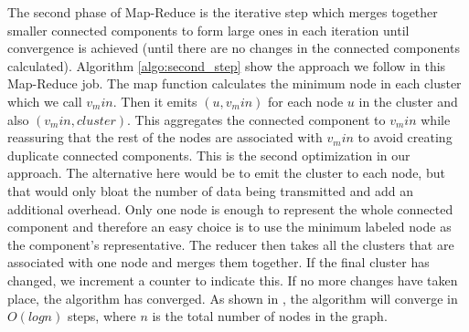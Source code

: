 The second phase of Map-Reduce is the iterative step which merges together smaller connected components to form large ones in each iteration until convergence is achieved (\ie until there are no changes in the connected components calculated). Algorithm \ref{algo:second_step} show the approach we follow in this Map-Reduce job. The map function calculates the minimum node in each cluster which we call $v_min$. Then it emits $(u, v_min)$ for each node $u$ in the cluster and also $(v_min, cluster)$. This aggregates the connected component to $v_min$ while reassuring that the rest of the nodes are associated with $v_min$ to avoid creating duplicate connected components. This is the second optimization in our approach. The alternative here would be to emit the cluster to each node, but that would only bloat the number of data being transmitted and add an additional overhead. Only one node is enough to represent the whole connected component and therefore an easy choice is to use the minimum labeled node as the component's representative. The reducer then takes all the clusters that are associated with one node and merges them together. If the final cluster has changed, we increment a counter to indicate this. If no more changes have taken place, the algorithm has converged. As shown in \cite{rastogi}, the algorithm will converge in $O(logn)$ steps, where $n$ is the total number of nodes in the graph.



